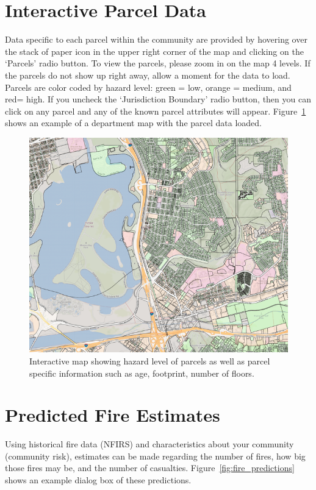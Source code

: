 \documentclass[12pt,oneside]{book}
\begin{document}
\FloatBarrier

\section{Interactive Parcel Data}

Data specific to each parcel within the community are provided by hovering over the stack of paper icon in the upper right corner of the map and clicking on the `Parcels' radio button. To view the parcels, please zoom in on the map 4 levels. If the parcels do not show up right away, allow a moment for the data to load. Parcels are color coded by hazard level: green = low, orange = medium, and red= high. If you uncheck the `Jurisdiction Boundary' radio button, then you can click on any parcel and any of the known parcel attributes will appear. Figure~\ref{fig:parcel_data} shows an example of a department map with the parcel data loaded.

\begin{figure}[ht!]
\centering
\includegraphics[width=.9\columnwidth]{Figures/parcel_data}
\caption{Interactive map showing hazard level of parcels as well as parcel specific information such as age, footprint, number of floors.}
\label{fig:parcel_data}
\end{figure}

\FloatBarrier

\section{Predicted Fire Estimates}

Using historical fire data (NFIRS) and characteristics about your community (community risk), estimates can be made regarding the number of fires, how big those fires may be, and the number of casualties. Figure~\ref{fig:fire_predictions} shows an example dialog box of these predictions.
\end{document}
